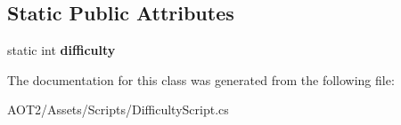 \subsection*{Static Public Attributes}
\begin{DoxyCompactItemize}
\item 
\hypertarget{class_difficulty_script_a1a931c1e4bc7c3465dc3e6a0bb4ac9d8}{}static int {\bfseries difficulty}\label{class_difficulty_script_a1a931c1e4bc7c3465dc3e6a0bb4ac9d8}

\end{DoxyCompactItemize}


The documentation for this class was generated from the following file\+:\begin{DoxyCompactItemize}
\item 
A\+O\+T2/\+Assets/\+Scripts/Difficulty\+Script.\+cs\end{DoxyCompactItemize}
